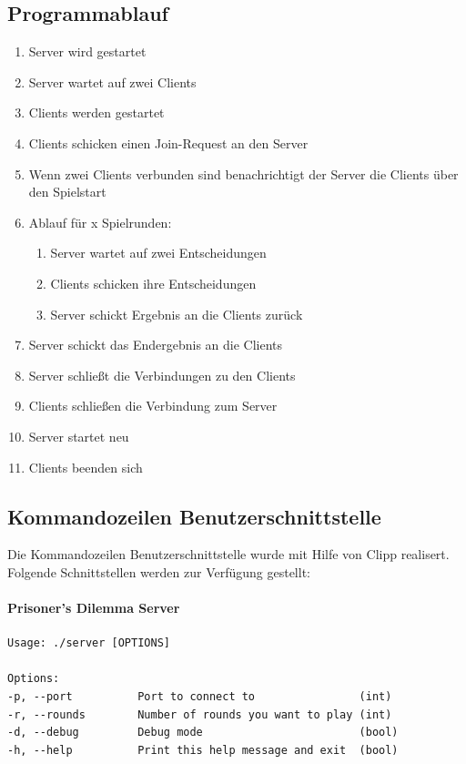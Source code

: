 \documentclass[12pt, letterpaper]{article}
\begin{document}
\subsection{Programmablauf}
\begin{enumerate}
	\item Server wird gestartet
	\item Server wartet auf zwei Clients
	\item Clients werden gestartet
	\item Clients schicken einen Join-Request an den Server
	\item Wenn zwei Clients verbunden sind benachrichtigt der Server die Clients über den Spielstart
	\item Ablauf für x Spielrunden:
	\begin{enumerate}
		\item Server wartet auf zwei Entscheidungen
		\item Clients schicken ihre Entscheidungen
		\item Server schickt Ergebnis an die Clients zurück
	\end{enumerate}
	\item Server schickt das Endergebnis an die Clients
	\item Server schließt die Verbindungen zu den Clients
	\item Clients schließen die Verbindung zum Server
	\item Server startet neu
	\item Clients beenden sich
\end{enumerate}

\newpage

\subsection{Kommandozeilen Benutzerschnittstelle}
Die Kommandozeilen Benutzerschnittstelle wurde mit Hilfe von Clipp realisert. Folgende Schnittstellen werden zur Verfügung gestellt:

\paragraph{Prisoner's Dilemma Server}
\begin{Verbatim}[fontsize=\small]
Usage: ./server [OPTIONS]

Options:
-p, --port          Port to connect to                (int)
-r, --rounds        Number of rounds you want to play (int)
-d, --debug         Debug mode                        (bool)
-h, --help          Print this help message and exit  (bool)
\end{Verbatim}
\end{document}
